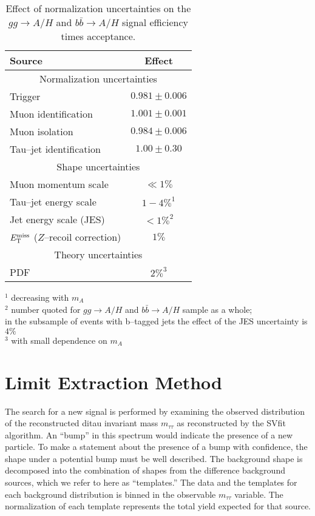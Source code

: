 \begin{table}[t]
\begin{center}
\tablesize
\begin{tabular}{|l|c|}
\hline
Source & Effect \\
\hline
\hline
\multicolumn{2}{|c|}{Normalization uncertainties} \\
\hline
Trigger                         & $0.981 \pm 0.006$ \\
Muon identification             & $1.001 \pm 0.001$ \\
Muon isolation                  & $0.984 \pm 0.006$ \\
Tau--jet identification         & $1.00  \pm 0.30$ \\
\hline
\hline
\multicolumn{2}{|c|}{Shape uncertainties} \\
\hline
Muon momentum scale             & $\ll 1\%$ \\
Tau--jet energy scale           & $1 - 4\%^{1}$ \\
Jet energy scale (JES)          & $< 1\%^{2}$ \\
$E_{\mathrm{T}}^{\text{miss}}$ ($Z$--recoil correction) & $1\%$ \\
\hline
\hline
\multicolumn{2}{|c|}{Theory uncertainties} \\
\hline
PDF & $2\%^{3}$ \\
\hline
\end{tabular}
\end{center}
$^{1}$ decreasing with $m_{A}$ \\
$^{2}$ number quoted for $gg \to A/H$ and $b\bar{b} \to A/H$ sample as a whole; \\
\hspace{5mm} in the subsample of events with b--tagged jets the effect of the JES uncertainty is $4\%$ \\
$^{3}$ with small dependence on $m_{A}$ \\
\begin{center}
\caption[Effect of normalization uncertainties on signal efficiency times
acceptance]{\captiontext Effect of normalization uncertainties on the $gg \to
A/H$ and $b\bar{b} \to A/H$ signal efficiency times acceptance.}
\label{tab:ExpUncertainties}
\end{center}
\end{table}
%
\section{Limit Extraction Method}
\label{sec:statmethod}
%
The search for a new signal is performed by examining the observed distribution
of the reconstructed ditau invariant mass $m_{\tau\tau}$ as reconstructed by the SVfit
algorithm.  An ``bump'' in this spectrum would indicate the presence of a new
particle.  To make a statement about the presence of a bump with confidence, the
shape under a potential bump must be well described.  The background shape is
decomposed into the combination of shapes from the difference background
sources, which we refer to here as ``templates.'' The data and the templates for
each background distribution is binned in the observable $m_{\tau\tau}$
variable.  The normalization of each template represents the total yield
expected for that source.

